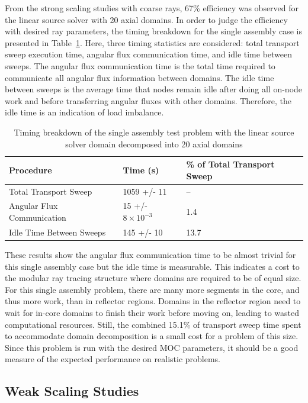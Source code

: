 From the strong scaling studies with coarse rays, 67\% efficiency was observed for the linear source solver with 20 axial domains. In order to judge the efficiency with desired ray parameters, the timing breakdown for the single assembly case is presented in Table~\ref{tab:dd-sa-breakdown}. Here, three timing statistics are considered: total transport sweep execution time, angular flux communication time, and idle time between sweeps. The angular flux communication time is the total time required to communicate all angular flux information between domains. The idle time between sweeps is the average time that nodes remain idle after doing all on-node work and before transferring angular fluxes with other domains. Therefore, the idle time is an indication of load imbalance.

\begin{table}[ht]
	\centering
	\caption{Timing breakdown of the single assembly test problem with the linear source solver domain decomposed into 20 axial domains}
	\medskip
	\begin{tabular}{l|l|l}
		Procedure & Time (s)  & \% of Total Transport Sweep \\
		\hline
		\hline
		Total Transport Sweep & 1059 +/- 11 & -- \\
		\hline
		Angular Flux Communication & 15 +/- $8 \times 10^{-3}$ & 1.4 \\
		Idle Time Between Sweeps & 145 +/- 10 & 13.7 \\
		\hline
	\end{tabular}
	\label{tab:dd-sa-breakdown}
\end{table}

These results show the angular flux communication time to be almost trivial for this single assembly case but the idle time is measurable. This indicates a cost to the modular ray tracing structure where domains are required to be of equal size. For this single assembly problem, there are many more segments in the core, and thus more work, than in reflector regions. Domains in the reflector region need to wait for in-core domains to finish their work before moving on, leading to wasted computational resources. Still, the combined 15.1\% of transport sweep time spent to accommodate domain decomposition is a small cost for a problem of this size. Since this problem is run with the desired \ac{MOC} parameters, it should be a good measure of the expected performance on realistic problems.

\subsection{Weak Scaling Studies}
\label{sec:dd-weak-scaling}

